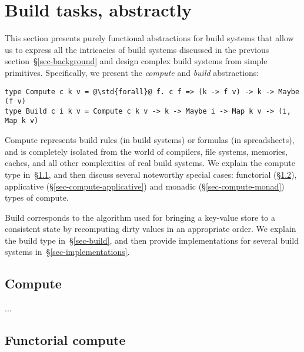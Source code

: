 \section{Build tasks, abstractly}\label{sec-compute}

This section presents purely functional abstractions for build systems that
allow us to express all the intricacies of build systems discussed in the
previous section~\S\ref{sec-background} and design complex build systems from
simple primitives. Specifically, we present the \emph{compute} and \emph{build}
abstractions:

\begin{verbatim}
type Compute c k v = @\std{forall}@ f. c f => (k -> f v) -> k -> Maybe (f v)
type Build c i k v = Compute c k v -> k -> Maybe i -> Map k v -> (i, Map k v)
\end{verbatim}

\noindent
Compute represents build rules (in build systems) or formulas (in spreadsheets),
and is completely isolated from the world of compilers, file systems, memories,
caches, and all other complexities of real build systems. We explain the compute
type in~\S\ref{sec-general-compute}, and then discuss several noteworthy special cases:
functorial (\S\ref{sec-compute-functor}), applicative
(\S\ref{sec-compute-applicative}) and monadic (\S\ref{sec-compute-monad}) types
of compute.

Build corresponds to the algorithm used for bringing a key-value store to a
consistent state by recomputing dirty values in an appropriate order. We explain
the build type in~\S\ref{sec-build}, and then provide implementations for several
build systems in~\S\ref{sec-implementations}.

\subsection{Compute}\label{sec-general-compute}

...

\subsection{Functorial compute}\label{sec-compute-functor}

